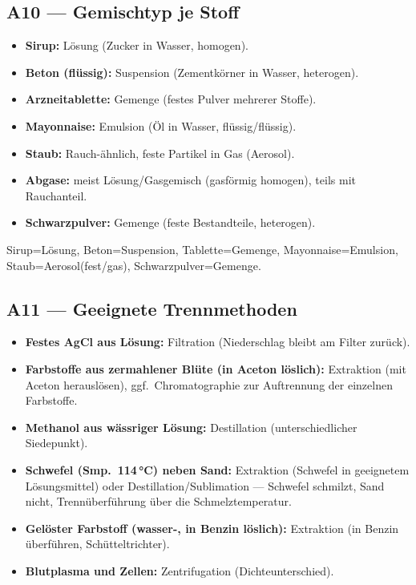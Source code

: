 
\subsection*{A10 --- Gemischtyp je Stoff}
\begin{itemize}
  \item \textbf{Sirup:} Lösung (Zucker in Wasser, homogen).
  \item \textbf{Beton (flüssig):} Suspension (Zementkörner in Wasser, heterogen).
  \item \textbf{Arzneitablette:} Gemenge (festes Pulver mehrerer Stoffe).
  \item \textbf{Mayonnaise:} Emulsion (Öl in Wasser, flüssig/flüssig).
  \item \textbf{Staub:} Rauch-ähnlich, feste Partikel in Gas (Aerosol).
  \item \textbf{Abgase:} meist Lösung/Gasgemisch (gasförmig homogen), teils
        mit Rauchanteil.
  \item \textbf{Schwarzpulver:} Gemenge (feste Bestandteile, heterogen).
\end{itemize}

\begin{ergebnis}
Sirup=Lösung, Beton=Suspension, Tablette=Gemenge, Mayonnaise=Emulsion,
Staub=Aerosol(fest/gas), Schwarzpulver=Gemenge.
\end{ergebnis}

\subsection*{A11 --- Geeignete Trennmethoden}
\begin{itemize}
  \item \textbf{Festes AgCl aus Lösung:} Filtration (Niederschlag bleibt am
        Filter zurück).
  \item \textbf{Farbstoffe aus zermahlener Blüte (in Aceton löslich):}
        Extraktion (mit Aceton herauslösen), ggf.\ Chromatographie zur
        Auftrennung der einzelnen Farbstoffe.
  \item \textbf{Methanol aus wässriger Lösung:} Destillation
        (unterschiedlicher Siedepunkt).
  \item \textbf{Schwefel (Smp.\ 114\,°C) neben Sand:} Extraktion (Schwefel
        in geeignetem Lösungsmittel) oder Destillation/Sublimation ---
        Schwefel schmilzt, Sand nicht, Trennüberführung über die
        Schmelztemperatur.
  \item \textbf{Gelöster Farbstoff (wasser-, in Benzin löslich):}
        Extraktion (in Benzin überführen, Schütteltrichter).
  \item \textbf{Blutplasma und Zellen:} Zentrifugation (Dichteunterschied).
\end{itemize}

